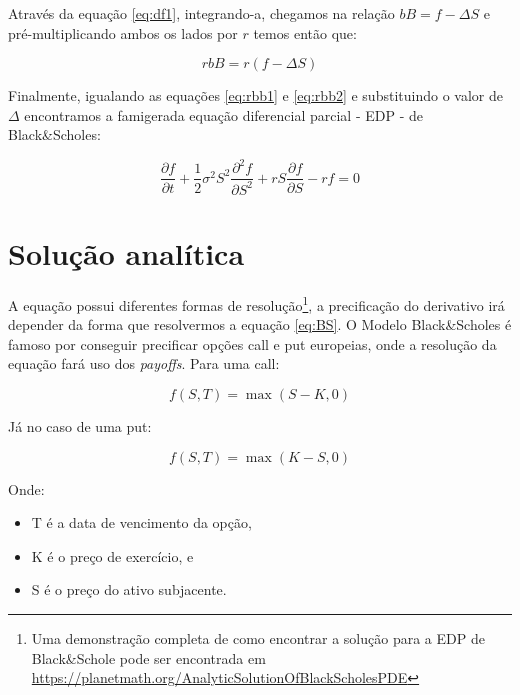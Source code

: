 \documentclass[]{book}
\providecommand{\tightlist}{%
  \setlength{\itemsep}{0pt}\setlength{\parskip}{0pt}}
\let\rmarkdownfootnote\footnote%
\def\footnote{\protect\rmarkdownfootnote}
\theoremstyle{definition}
\theoremstyle{definition}
\theoremstyle{definition}
\theoremstyle{remark}
\begin{document}
Através da equação \eqref{eq:df1}, integrando-a, chegamos na relação
\(bB = f - \Delta S\) e pré-multiplicando ambos os lados por \(r\) temos
então que:

\begin{equation}
rbB = r(f-\Delta S) 
\label{eq:rbb2}
\end{equation}

Finalmente, igualando as equações \eqref{eq:rbb1} e \eqref{eq:rbb2} e
substituindo o valor de \(\Delta\) encontramos a famigerada equação
diferencial parcial - EDP - de Black\&Scholes:

\begin{equation}
\frac{\partial f}{\partial t}+\frac{1}{2}\sigma^2S^2\frac{\partial^2 f}{\partial S^2}+rS\frac{\partial f}{\partial S} - rf = 0
\label{eq:BS}
\end{equation}

\section{Solução analítica}\label{solucao-analitica}

A equação possui diferentes formas de resolução\footnote{Uma
  demonstração completa de como encontrar a solução para a EDP de
  Black\&Schole pode ser encontrada em
  \url{https://planetmath.org/AnalyticSolutionOfBlackScholesPDE}}, a
precificação do derivativo irá depender da forma que resolvermos a
equação \eqref{eq:BS}. O Modelo Black\&Scholes é famoso por conseguir
precificar opções call e put europeias, onde a resolução da equação fará
uso dos \emph{payoffs}. Para uma call:

\begin{equation}
\displaystyle f(S,T)=\max(S-K,0)
\label{eq:cpayoff}
\end{equation}

Já no caso de uma put:

\begin{equation}
\displaystyle f(S,T)=\max(K-S,0)
\label{eq:ppayoff}
\end{equation}

Onde:

\begin{itemize}
\tightlist
\item
  T é a data de vencimento da opção,
\item
  K é o preço de exercício, e
\item
  S é o preço do ativo subjacente.
\end{itemize}
\end{document}
